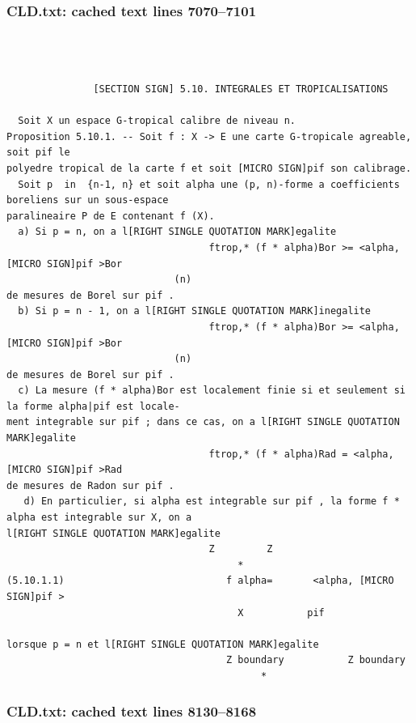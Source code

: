 \documentclass[
  11pt,
]{article}
\begin{document}
\subsubsection{CLD.txt: cached text lines
7070--7101}\label{cld.txt-cached-text-lines-70707101}

\begin{lstlisting}



               [SECTION SIGN] 5.10. INTEGRALES ET TROPICALISATIONS

  Soit X un espace G-tropical calibre de niveau n.
Proposition 5.10.1. -- Soit f : X -> E une carte G-tropicale agreable, soit pif le
polyedre tropical de la carte f et soit [MICRO SIGN]pif son calibrage.
  Soit p  in  {n-1, n} et soit alpha une (p, n)-forme a coefficients boreliens sur un sous-espace
paralineaire P de E contenant f (X).
  a) Si p = n, on a l[RIGHT SINGLE QUOTATION MARK]egalite
                                   ftrop,* (f * alpha)Bor >= <alpha, [MICRO SIGN]pif >Bor
                             (n)
de mesures de Borel sur pif .
  b) Si p = n - 1, on a l[RIGHT SINGLE QUOTATION MARK]inegalite
                                   ftrop,* (f * alpha)Bor >= <alpha, [MICRO SIGN]pif >Bor
                             (n)
de mesures de Borel sur pif .
  c) La mesure (f * alpha)Bor est localement finie si et seulement si la forme alpha|pif est locale-
ment integrable sur pif ; dans ce cas, on a l[RIGHT SINGLE QUOTATION MARK]egalite
                                   ftrop,* (f * alpha)Rad = <alpha, [MICRO SIGN]pif >Rad
de mesures de Radon sur pif .
   d) En particulier, si alpha est integrable sur pif , la forme f * alpha est integrable sur X, on a
l[RIGHT SINGLE QUOTATION MARK]egalite
                                   Z         Z
                                        *
(5.10.1.1)                            f alpha=       <alpha, [MICRO SIGN]pif >
                                        X           pif

lorsque p = n et l[RIGHT SINGLE QUOTATION MARK]egalite
                                      Z boundary           Z boundary 
                                            *
\end{lstlisting}

\subsubsection{CLD.txt: cached text lines
8130--8168}\label{cld.txt-cached-text-lines-81308168}
\end{document}
